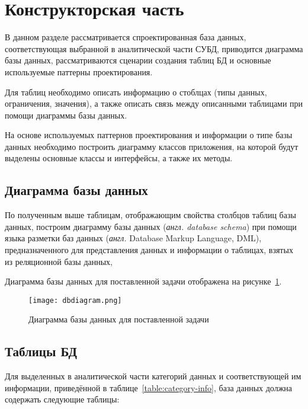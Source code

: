 \section{\large Конструкторская часть}

В  данном  разделе  рассматривается спроектированная база данных, соответствующая выбранной в  аналитической части СУБД, приводится диаграмма базы данных, рассматриваются сценарии создания таблиц БД и основные используемые паттерны проектирования.

Для таблиц необходимо описать информацию о стоблцах (типы данных, ограничения, значения), а также описать связь между описанными таблицами при помощи диаграммы базы данных.

На основе используемых паттернов проектирования и информации о типе базы данных необходимо построить диаграмму классов приложения, на которой будут выделены основные классы и интерфейсы, а также их методы.

\subsection{Диаграмма базы данных}

По полученным выше таблицам, отображающим свойства столбцов таблиц базы данных, построим диаграмму базы данных (\textit{англ. database schema}) при помощи языка разметки баз данных (\textit{англ.} Database Markup Language, DML), предназначенного для представления данных и информации о таблицах, взятых из реляционной базы данных,

Диаграмма базы данных для поставленной задачи отображена на рисунке~\ref{fig:dbdiagram}.

\begin{figure}[h!]
	\centering
	\captionsetup{justification=centering}
	\texttt{[image: dbdiagram.png]}
	\caption{Диаграмма базы данных для поставленной задачи}
	\label{fig:dbdiagram}
\end{figure}

\subsection{Таблицы БД}

Для выделенных в аналитической части категорий данных и соответствующей им информации, приведённой в таблице~\ref{table:category-info}, база данных должна содержать следующие таблицы:

